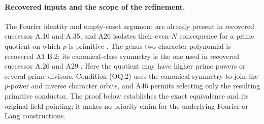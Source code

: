 \paragraph{Recovered inputs and the scope of the refinement.}
The Fourier identity and empty-coset argument are already present
in recovered successor A.10 and A.35, and A26 isolates their
even-$N$ consequence for a prime quotient on which $p$ is primitive
\cite[A.10, A.35]{ASrun}. The genus-two character polynomial is
recovered A1 B.2; its canonical-class symmetry is the one used in
recovered successor A.26 and A29 \cite[B.2]{A1run}\cite[A.26]{ASrun}.
Here the quotient may have higher prime powers or several prime
divisors. Condition (OQ.2) uses the canonical symmetry to join the
$p$-power and inverse character orbits, and A46 permits selecting
only the resulting primitive conductor. The proof below establishes
the exact equivalence and its original-field pointing; it makes no
priority claim for the underlying Fourier or Lang constructions.

